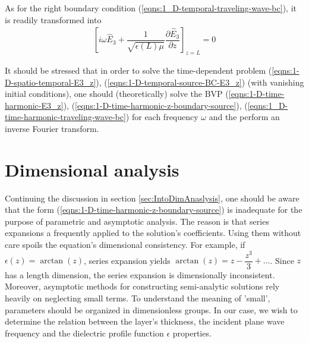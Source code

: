 \documentclass[12pt,twoside]{report}
\begin{document}
As for the right boundary condition (\ref{eqns:1_D-temporal-traveling-wave-bc}), it is readily transformed into
\begin{align}
\label{eqns:1_D-time-harmonic-traveling-wave-bc}
\left[ i \omega \hat{E}_3 + \dfrac{1}{\sqrt{\epsilon(L)\mu}} \dfrac{\partial \hat{E}_3}{\partial z} \right]_{z = L}=0
\end{align}

It should be stressed that in order to solve the time-dependent problem (\ref{eqns:1-D-spatio-temporal-E3_z}), (\ref{eqns:1-D-temporal-source-BC-E3_z}) (with vanishing initial conditions), one should (theoretically) solve the BVP
(\ref{eqns:1-D-time-harmonic-E3_z}), (\ref{eqns:1-D-time-harmonic-z-boundary-source}), (\ref{eqns:1_D-time-harmonic-traveling-wave-bc}) for each frequency $\omega$ and the perform an inverse Fourier transform.\\


\section{Dimensional analysis }
Continuing the discussion in section \ref{sec:IntoDimAnaslysis}, one should be aware that the form (\ref{eqns:1-D-time-harmonic-z-boundary-source}) is inadequate for the purpose of parametric and asymptotic analysis. The reason is that series expansions a frequently applied to the solution's coefficients. Using them without care spoils the equation's dimensional consistency. For example, if $\epsilon(z) = \arctan(z)$, series expansion yields $\arctan(z) = z-\dfrac{z^3}{3} + \ldots$. Since $z$ has a length dimension, the series expansion is dimensionally inconsistent. Moreover, asymptotic methods for constructing semi-analytic solutions rely heavily on neglecting small terms. To understand the meaning of 'small', parameters should be organized in dimensionless groups. In our case, we wish to determine the relation between the layer's thickness, the incident plane wave frequency and the dielectric profile function $\epsilon$ properties.
\begin{comment} 
\begin{itemize}
\item The dielectric profile's dynamic range - the difference between its $-\infty$ and $+\infty$ values, normalized by the $-\infty$ limit to  get an 'effective jump' measure;
\item The dielectric profile's proximity to a step function, essentially expressed by the size of the function's $z$-derivative at $z=0$ and the rate of its decay toward $\pm \infty$.
\end{itemize}
\end{comment}
\end{document}
